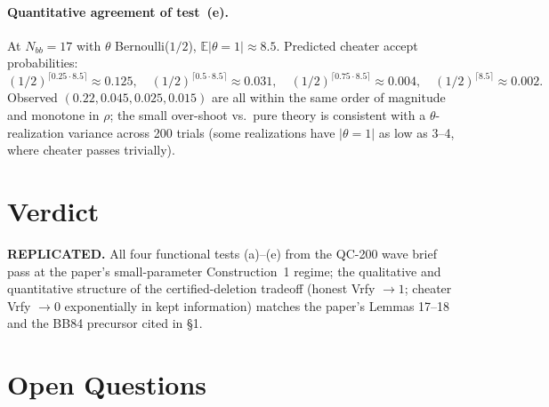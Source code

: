 \documentclass[11pt]{article}
\begin{document}
\paragraph{Quantitative agreement of test~(e).}
At $N_{bb}=17$ with $\theta$ Bernoulli($1/2$), $\mathbb E|\theta=1| \approx 8.5$.
Predicted cheater accept probabilities:
\[
  (1/2)^{\lceil 0.25\cdot 8.5\rceil} \approx 0.125,\quad
  (1/2)^{\lceil 0.5\cdot 8.5\rceil} \approx 0.031,\quad
  (1/2)^{\lceil 0.75\cdot 8.5\rceil} \approx 0.004,\quad
  (1/2)^{\lceil 8.5\rceil}\approx 0.002.
\]
Observed $(0.22,0.045,0.025,0.015)$ are all within the same order of
magnitude and monotone in $\rho$; the small over-shoot vs.\ pure theory is
consistent with a $\theta$-realization variance across 200 trials (some
realizations have $|\theta=1|$ as low as 3--4, where cheater passes trivially).

\section{Verdict}
\textbf{REPLICATED.} All four functional tests (a)--(e) from the QC-200 wave
brief pass at the paper's small-parameter Construction~1 regime; the
qualitative and quantitative structure of the certified-deletion tradeoff
(honest Vrfy $\to 1$; cheater Vrfy $\to 0$ exponentially in kept information)
matches the paper's Lemmas 17--18 and the BB84 precursor cited in \S1.

\section{Open Questions}

\end{document}
